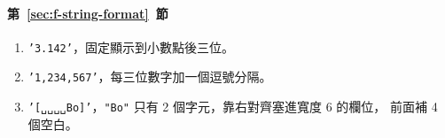 \paragraph{第~\ref{sec:f-string-format}~節}
\begin{enumerate}
\item \texttt{'3.142'}，固定顯示到小數點後三位。
\item \texttt{'1,234,567'}，每三位數字加一個逗號分隔。
\item \texttt{'[␣␣␣␣Bo]'}，\texttt{"Bo"} 只有 2 個字元，靠右對齊塞進寬度 6 的欄位，
前面補 4 個空白。
\end{enumerate}

